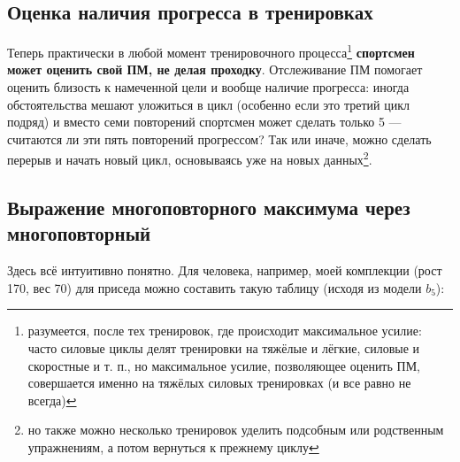\documentclass[
]{article}
\begin{document}
\hypertarget{ux43eux446ux435ux43dux43aux430-ux43dux430ux43bux438ux447ux438ux44f-ux43fux440ux43eux433ux440ux435ux441ux441ux430-ux432-ux442ux440ux435ux43dux438ux440ux43eux432ux43aux430ux445}{%
\subsection{Оценка наличия прогресса в
тренировках}\label{ux43eux446ux435ux43dux43aux430-ux43dux430ux43bux438ux447ux438ux44f-ux43fux440ux43eux433ux440ux435ux441ux441ux430-ux432-ux442ux440ux435ux43dux438ux440ux43eux432ux43aux430ux445}}

Теперь практически в любой момент тренировочного процесса\footnote{разумеется,
  после тех тренировок, где происходит максимальное усилие: часто
  силовые циклы делят тренировки на тяжёлые и лёгкие, силовые и
  скоростные и т. п., но максимальное усилие, позволяющее оценить ПМ,
  совершается именно на тяжёлых силовых тренировках (и все равно не
  всегда)} \textbf{спортсмен может оценить свой ПМ, не делая проходку}.
Отслеживание ПМ помогает оценить близость к намеченной цели и вообще
наличие прогресса: иногда обстоятельства мешают уложиться в цикл
(особенно если это третий цикл подряд) и вместо семи повторений
спортсмен может сделать только 5 --- считаются ли эти пять повторений
прогрессом? Так или иначе, можно сделать перерыв и начать новый цикл,
основываясь уже на новых данных\footnote{но также можно несколько
  тренировок уделить подсобным или родственным упражнениям, а потом
  вернуться к прежнему циклу}.

\hypertarget{ux432ux44bux440ux430ux436ux435ux43dux438ux435-ux43cux43dux43eux433ux43eux43fux43eux432ux442ux43eux440ux43dux43eux433ux43e-ux43cux430ux43aux441ux438ux43cux443ux43cux430-ux447ux435ux440ux435ux437-ux43cux43dux43eux433ux43eux43fux43eux432ux442ux43eux440ux43dux44bux439}{%
\subsection{Выражение многоповторного максимума через
многоповторный}\label{ux432ux44bux440ux430ux436ux435ux43dux438ux435-ux43cux43dux43eux433ux43eux43fux43eux432ux442ux43eux440ux43dux43eux433ux43e-ux43cux430ux43aux441ux438ux43cux443ux43cux430-ux447ux435ux440ux435ux437-ux43cux43dux43eux433ux43eux43fux43eux432ux442ux43eux440ux43dux44bux439}}

Здесь всё интуитивно понятно. Для человека, например, моей комплекции
(рост 170, вес 70) для приседа можно составить такую таблицу (исходя из
модели \(b_5\)):
\end{document}

